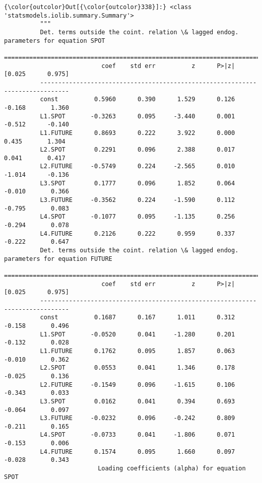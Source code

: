 \documentclass[11pt]{article}
\begin{document}
\begin{Verbatim}[commandchars=\\\{\}]
{\color{outcolor}Out[{\color{outcolor}338}]:} <class 'statsmodels.iolib.summary.Summary'>
          """
          Det. terms outside the coint. relation \& lagged endog. parameters for equation SPOT
          ==============================================================================
                           coef    std err          z      P>|z|      [0.025      0.975]
          ------------------------------------------------------------------------------
          const          0.5960      0.390      1.529      0.126      -0.168       1.360
          L1.SPOT       -0.3263      0.095     -3.440      0.001      -0.512      -0.140
          L1.FUTURE      0.8693      0.222      3.922      0.000       0.435       1.304
          L2.SPOT        0.2291      0.096      2.388      0.017       0.041       0.417
          L2.FUTURE     -0.5749      0.224     -2.565      0.010      -1.014      -0.136
          L3.SPOT        0.1777      0.096      1.852      0.064      -0.010       0.366
          L3.FUTURE     -0.3562      0.224     -1.590      0.112      -0.795       0.083
          L4.SPOT       -0.1077      0.095     -1.135      0.256      -0.294       0.078
          L4.FUTURE      0.2126      0.222      0.959      0.337      -0.222       0.647
          Det. terms outside the coint. relation \& lagged endog. parameters for equation FUTURE
          ==============================================================================
                           coef    std err          z      P>|z|      [0.025      0.975]
          ------------------------------------------------------------------------------
          const          0.1687      0.167      1.011      0.312      -0.158       0.496
          L1.SPOT       -0.0520      0.041     -1.280      0.201      -0.132       0.028
          L1.FUTURE      0.1762      0.095      1.857      0.063      -0.010       0.362
          L2.SPOT        0.0553      0.041      1.346      0.178      -0.025       0.136
          L2.FUTURE     -0.1549      0.096     -1.615      0.106      -0.343       0.033
          L3.SPOT        0.0162      0.041      0.394      0.693      -0.064       0.097
          L3.FUTURE     -0.0232      0.096     -0.242      0.809      -0.211       0.165
          L4.SPOT       -0.0733      0.041     -1.806      0.071      -0.153       0.006
          L4.FUTURE      0.1574      0.095      1.660      0.097      -0.028       0.343
                          Loading coefficients (alpha) for equation SPOT                

\end{Verbatim}
\end{document}
